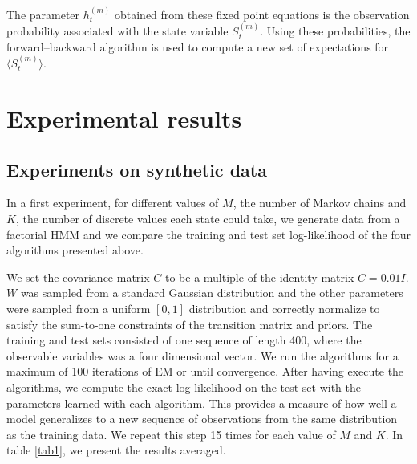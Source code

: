 \documentclass{article}
\begin{document}
The parameter $h_t^{(m)}$ obtained from these fixed point equations is the observation probability associated with the state variable $S_t^{(m)}$. Using these probabilities, the forward–backward algorithm is used to compute a new set of expectations for $\langle S_t^{(m)} \rangle$.

\section{Experimental results}

\subsection{Experiments on synthetic data}

In a first experiment, for different values of $M$, the number of Markov chains and $K$, the number of discrete values each state could take, we generate data from a factorial HMM and we compare the training and test set log-likelihood of the four algorithms presented above.

We set the covariance matrix $C$ to be a multiple of the identity matrix $C = 0.01 I$. $W$ was sampled from a standard Gaussian distribution and the other parameters were sampled from a uniform $[0,1]$ distribution and correctly normalize to satisfy the sum-to-one constraints of the transition matrix and priors. The training and test sets consisted of one sequence of length 400, where the observable variables was a four dimensional vector. We run the algorithms for a maximum of 100 iterations of EM or until convergence. After having execute the algorithms, we compute the exact log-likelihood on the test set with the parameters learned with each algorithm. This provides a measure of how well a model generalizes to a new sequence of observations from the same distribution as the training data. We repeat this step 15 times for each value of $M$ and $K$. In table \ref{tab1}, we present the results averaged.
\end{document}
